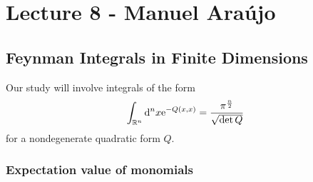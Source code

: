 \chapter{Lecture 8 - Manuel Araújo}

\section{Feynman Integrals in Finite Dimensions}

Our study will involve integrals of the form
\begin{equation*}
  \int_{\mathbb{R}^n} \mathrm{d}^n x \mathrm{e}^{-Q(x, x)} = \frac{\pi^{\frac{n}{2}}}{\sqrt{\det Q}}
\end{equation*}
for a nondegenerate quadratic form $Q$.

\subsection{Expectation value of monomials}

